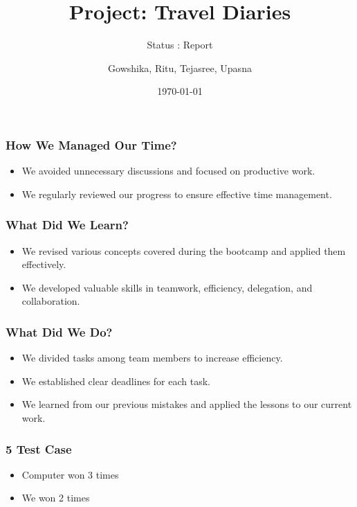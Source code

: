 \documentclass{beamer}
\title{Project: Travel Diaries}
\subtitle{Status : Report}
\author{Gowshika, Ritu, Tejasree, Upasna}
\date{\today}
\begin{document}
\frame{\titlepage}

\begin{frame}
\frametitle{How We Managed Our Time?}
\begin{itemize}
  \item We avoided unnecessary discussions and focused on productive work.
  \item We regularly reviewed our progress to ensure effective time management.
\end{itemize}
\end{frame}

\begin{frame}
\frametitle{What Did We Learn?}
\begin{itemize}
  \item We revised various concepts covered during the bootcamp and applied them effectively.
  \item We developed valuable skills in teamwork, efficiency, delegation, and collaboration.
\end{itemize}
\end{frame}

\begin{frame}
\frametitle{What Did We Do?}
\begin{itemize}
  \item We divided tasks among team members to increase efficiency.
  \item We established clear deadlines for each task.
  \item We learned from our previous mistakes and applied the lessons to our current work.
\end{itemize}
\end{frame}

\begin{frame}
\frametitle{ 5 Test Case}
\begin{itemize}
  \item Computer won 3 times
  \item We won 2 times
\end{itemize}
\end{frame}
\end{document}
